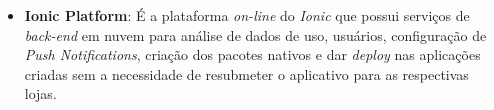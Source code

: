\begin{itemize}
    \item \textbf{Ionic Platform}: É a plataforma \textit{on-line} do \textit{Ionic} que possui serviços de \textit{back-end} em nuvem para análise de dados de uso,
     usuários, configuração de \textit{Push Notifications}, criação dos pacotes nativos e dar \textit{deploy} nas aplicações criadas sem a necessidade de
     resubmeter o aplicativo para as respectivas lojas. 
     
\end{itemize}
